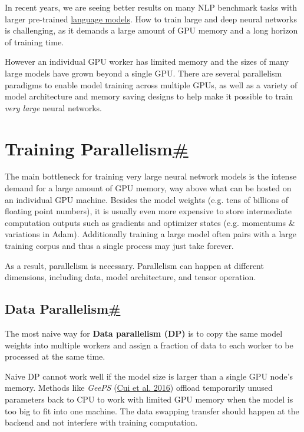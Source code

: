 In recent years, we are seeing better results on many NLP benchmark tasks with larger pre-trained \href{https://lilianweng.github.io/posts/2019-01-31-lm/}{language models}. How to train large and deep neural networks is challenging, as it demands a large amount of GPU memory and a long horizon of training time.

However an individual GPU worker has limited memory and the sizes of many large models have grown beyond a single GPU. There are several parallelism paradigms to enable model training across multiple GPUs, as well as a variety of model architecture and memory saving designs to help make it possible to train \emph{very large} neural networks.

\section{\texorpdfstring{Training Parallelism\hyperref[training-parallelism]{\#}}{Training Parallelism\#}}\label{training-parallelism}

The main bottleneck for training very large neural network models is the intense demand for a large amount of GPU memory, way above what can be hosted on an individual GPU machine. Besides the model weights (e.g. tens of billions of floating point numbers), it is usually even more expensive to store intermediate computation outputs such as gradients and optimizer states (e.g. momentums \& variations in Adam). Additionally training a large model often pairs with a large training corpus and thus a single process may just take forever.

As a result, parallelism is necessary. Parallelism can happen at different dimensions, including data, model architecture, and tensor operation.

\subsection{\texorpdfstring{Data Parallelism\hyperref[data-parallelism]{\#}}{Data Parallelism\#}}\label{data-parallelism}

The most naive way for \textbf{Data parallelism (DP)} is to copy the same model weights into multiple workers and assign a fraction of data to each worker to be processed at the same time.

Naive DP cannot work well if the model size is larger than a single GPU node's memory. Methods like \emph{GeePS} (\href{https://www.pdl.cmu.edu/PDL-FTP/CloudComputing/GeePS-cui-eurosys16.pdf}{Cui et al. 2016}) offload temporarily unused parameters back to CPU to work with limited GPU memory when the model is too big to fit into one machine. The data swapping transfer should happen at the backend and not interfere with training computation.

